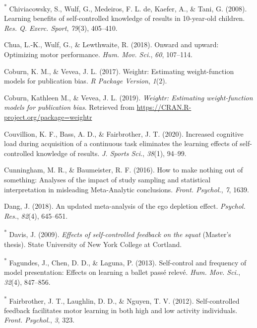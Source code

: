 \documentclass[
  english,
  man, donotrepeattitle,floatsintext]{apa7}
\newlength{\cslhangindent}
\newlength{\cslentryspacingunit} %
\newenvironment{CSLReferences}[2] %
 {%
  \setlength{\parindent}{0pt}
  \ifodd #1
  \let\oldpar\par
  \def\par{\hangindent=\cslhangindent\oldpar}
  \fi
  \setlength{\parskip}{#2\cslentryspacingunit}
 }%
 {}
\begin{document}
\begin{CSLReferences}{1}{0}
\leavevmode{}%
\textsuperscript{*} Chiviacowsky, S., Wulf, G., Medeiros, F. L. de, Kaefer, A., \& Tani, G. (2008). Learning benefits of self-controlled knowledge of results in 10-year-old children. \emph{Res. Q. Exerc. Sport}, \emph{79}(3), 405--410.

\leavevmode{}%
Chua, L.-K., Wulf, G., \& Lewthwaite, R. (2018). Onward and upward: Optimizing motor performance. \emph{Hum. Mov. Sci.}, \emph{60}, 107--114.

\leavevmode{}%
Coburn, K. M., \& Vevea, J. L. (2017). Weightr: Estimating weight-function models for publication bias. \emph{R Package Version}, \emph{1}(2).

\leavevmode{}%
Coburn, Kathleen M., \& Vevea, J. L. (2019). \emph{Weightr: Estimating weight-function models for publication bias}. Retrieved from \url{https://CRAN.R-project.org/package=weightr}

\leavevmode{}%
Couvillion, K. F., Bass, A. D., \& Fairbrother, J. T. (2020). Increased cognitive load during acquisition of a continuous task eliminates the learning effects of self-controlled knowledge of results. \emph{J. Sports Sci.}, \emph{38}(1), 94--99.

\leavevmode{}%
Cunningham, M. R., \& Baumeister, R. F. (2016). How to make nothing out of something: Analyses of the impact of study sampling and statistical interpretation in misleading {Meta-Analytic} conclusions. \emph{Front. Psychol.}, \emph{7}, 1639.

\leavevmode{}%
Dang, J. (2018). An updated meta-analysis of the ego depletion effect. \emph{Psychol. Res.}, \emph{82}(4), 645--651.

\leavevmode{}%
\textsuperscript{*} Davis, J. (2009). \emph{Effects of self-controlled feedback on the squat} (Master's thesis). State University of New York College at Cortland.

\leavevmode{}%
\textsuperscript{*} Fagundes, J., Chen, D. D., \& Laguna, P. (2013). Self-control and frequency of model presentation: Effects on learning a ballet pass{é} relev{é}. \emph{Hum. Mov. Sci.}, \emph{32}(4), 847--856.

\leavevmode{}%
\textsuperscript{*} Fairbrother, J. T., Laughlin, D. D., \& Nguyen, T. V. (2012). Self-controlled feedback facilitates motor learning in both high and low activity individuals. \emph{Front. Psychol.}, \emph{3}, 323.


\end{CSLReferences}
\end{document}
